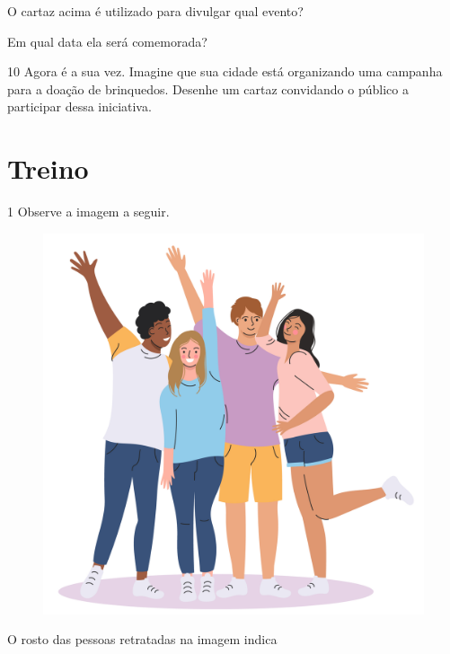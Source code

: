 
\begin{escolha}
\item O cartaz acima é utilizado para divulgar qual evento?\\

\item Em qual data ela será comemorada?\\
\end{escolha}

\num{10} Agora é a sua vez. Imagine que sua cidade está organizando uma campanha para a doação de brinquedos. Desenhe um cartaz convidando o público a participar dessa iniciativa.
\enlargethispage{2\baselineskip}

\begin{mdframed}[linewidth=2pt,linecolor=salmao]
\vspace{4cm}
\end{mdframed}

\pagebreak
\section*{Treino}

\num{1} Observe a imagem a seguir.

\begin{figure}[H]
\centering
\includegraphics[width=.7\textwidth]{media/image207.jpg}
\end{figure}

O rosto das pessoas retratadas na imagem indica

